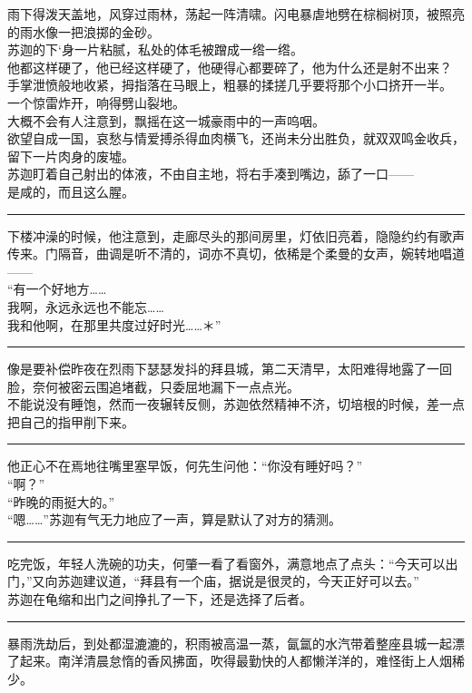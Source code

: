 \documentclass[oneside,11pt]{memoir} %
\begin{document}
\begin{CJK}{UTF8}{gbsn}
    雨下得泼天盖地，风穿过雨林，荡起一阵清啸。闪电暴虐地劈在棕榈树顶，被照亮的雨水像一把浪掷的金砂。\\\indent
    苏迦的下`身一片粘腻，私处的体毛被蹭成一绺一绺。\\\indent
    他都这样硬了，他已经这样硬了，他硬得心都要碎了，他为什么还是射不出来？\\\indent
    手掌泄愤般地收紧，拇指落在马眼上，粗暴的揉搓几乎要将那个小口挤开一半。\\\indent
    一个惊雷炸开，响得劈山裂地。\\\indent
    大概不会有人注意到，飘摇在这一城豪雨中的一声呜咽。\\\indent
    欲望自成一国，哀愁与情爱搏杀得血肉横飞，还尚未分出胜负，就双双鸣金收兵，留下一片肉身的废墟。    \\\indent
    苏迦盯着自己射出的体液，不由自主地，将右手凑到嘴边，舔了一口——\\\indent
    是咸的，而且这么腥。\\\indent
\rule{-3pt}{30pt}
    下楼冲澡的时候，他注意到，走廊尽头的那间房里，灯依旧亮着，隐隐约约有歌声传来。门隔音，曲调是听不清的，词亦不真切，依稀是个柔曼的女声，婉转地唱道——\\\indent
    “有一个好地方……\\\indent
    我啊，永远永远也不能忘……\\\indent
    我和他啊，在那里共度过好时光……＊”\\\indent
\rule{-3pt}{30pt}
    像是要补偿昨夜在烈雨下瑟瑟发抖的拜县城，第二天清早，太阳难得地露了一回脸，奈何被密云围追堵截，只委屈地漏下一点点光。\\\indent
    不能说没有睡饱，然而一夜辗转反侧，苏迦依然精神不济，切培根的时候，差一点把自己的指甲削下来。\\\indent
\rule{-3pt}{30pt}
    他正心不在焉地往嘴里塞早饭，何先生问他：“你没有睡好吗？”\\\indent
    “啊？”\\\indent
    “昨晚的雨挺大的。”\\\indent
    “嗯……”苏迦有气无力地应了一声，算是默认了对方的猜测。\\\indent
\rule{-3pt}{30pt}
    吃完饭，年轻人洗碗的功夫，何肇一看了看窗外，满意地点了点头：“今天可以出门，”又向苏迦建议道，“拜县有一个庙，据说是很灵的，今天正好可以去。”\\\indent
    苏迦在龟缩和出门之间挣扎了一下，还是选择了后者。\\\indent
\rule{-3pt}{30pt}
    暴雨洗劫后，到处都湿漉漉的，积雨被高温一蒸，氤氲的水汽带着整座县城一起漂了起来。南洋清晨怠惰的香风拂面，吹得最勤快的人都懒洋洋的，难怪街上人烟稀少。\\\indent

\end{CJK}
\end{document}
